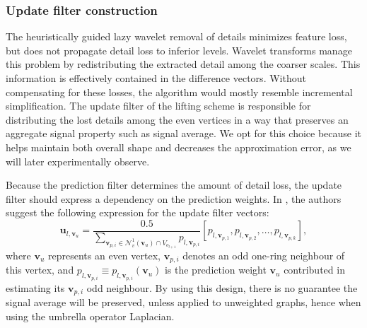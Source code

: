 \documentclass[graybox]{svmult}
\begin{document}
\subsubsection{Update filter construction}
The heuristically guided lazy wavelet removal of details minimizes feature loss, but does not propagate detail loss to inferior levels. Wavelet transforms manage this problem by redistributing the extracted detail among the coarser scales.  This information is effectively contained in the difference vectors. Without compensating for these losses, the algorithm would mostly resemble incremental simplification. The update filter of the lifting scheme is responsible for distributing the lost details among the even vertices in a way that preserves an aggregate signal property such as signal average. We opt for this choice because it helps maintain both overall shape and decreases the approximation error, as we will later experimentally observe. 

Because the prediction filter determines the amount of detail loss, the update filter should express a dependency on the prediction weights. In \cite{Martinez2011}, the authors suggest the following expression for the update filter vectors:
\begin{equation}
\mathbf{u}_{l, \mathbf{v}_{u}} = \frac{0.5}{ \sum\limits_{\mathbf{v}_{p,i} \in \mathcal{N}_v^1(\mathbf{v}_u) \cap V_{o_{l+1}}} {  p_{l, \mathbf{v}_{p,i} } } } \left[ p_{l, \mathbf{v}_{p,1} }, p_{l, \mathbf{v}_{p,2} }, \ldots , p_{l, \mathbf{v}_{p,k} }\right],
\label{eq_cds:smoothing_update_weights}
\end{equation}
where $\mathbf{v}_u$ represents an even vertex, $\mathbf{v}_{p,i}$ denotes an odd one-ring neighbour of this vertex, and $p_{l,\mathbf{v}_{p,i}} \equiv p_{l,\mathbf{v}_{p,i}}(\mathbf{v}_u)$ is the prediction weight $\mathbf{v}_u$ contributed in estimating its $\mathbf{v}_{p,i}$ odd neighbour.
By using this design, there is no guarantee the signal average will be preserved, unless applied to unweighted graphs, hence when using the umbrella operator Laplacian.
\end{document}
